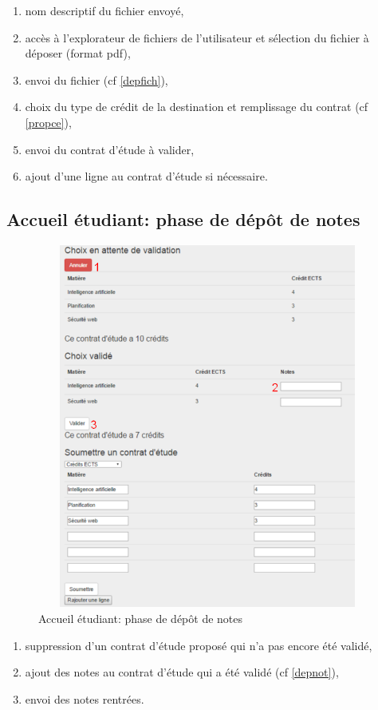     \begin{enumerate}
    	\item nom descriptif du fichier envoyé,
    	\item accès à l'explorateur de fichiers de l'utilisateur et sélection du fichier à déposer (format pdf),
    	\item envoi du fichier (cf \ref{depfich}),
    	\item choix du type de crédit de la destination et remplissage du contrat (cf \ref{propce}),
    	\item envoi du contrat d'étude à valider,
     	\item ajout d'une ligne au contrat d'étude si nécessaire.
    \end{enumerate}

  \subsection{Accueil étudiant: phase de dépôt de notes}
   	\label{pn}
  \begin{figure}[H]
  	\centering
  	
  	\includegraphics[width=14cm,height=12cm]{Images/Etudiant/notes_etud.png}
  	\caption{Accueil étudiant: phase de dépôt de notes}
  \end{figure}

    \begin{enumerate}
    	\item suppression d'un contrat d'étude proposé qui n'a pas encore été validé,
    	\item ajout des notes au contrat d'étude qui a été validé (cf \ref{depnot}),
    	\item envoi des notes rentrées.
    \end{enumerate}


